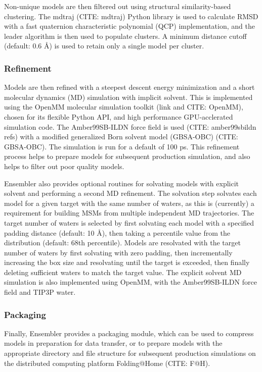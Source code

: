 \documentclass[aps,pre,twocolumn,nofootinbib,superscriptaddress,linenumbers]{revtex4-1}
\begin{document}
Non-unique models are then filtered out using structural similarity-based clustering.
The mdtraj (CITE: mdtraj) Python library is used to calculate RMSD with a fast quaternion characteristic polynomial (QCP) implementation, and the leader algorithm is then used to populate clusters.
A minimum distance cutoff (default: 0.6 \AA) is used to retain only a single model per cluster.

\subsubsection{Refinement}

Models are then refined with a steepest descent energy minimization and a short molecular dynamics (MD) simulation with implicit solvent.
This is implemented using the OpenMM molecular simulation toolkit (link and CITE: OpenMM), chosen for its flexible Python API, and high performance GPU-acclerated simulation code.
The Amber99SB-ILDN force field is used (CITE: amber99sbildn refs) with a modified generalized Born solvent model (GBSA-OBC) (CITE: GBSA-OBC).
The simulation is run for a default of 100 ps.
This refinement process helps to prepare models for subsequent production simulation, and also helps to filter out poor quality models.

Ensembler also provides optional routines for solvating models with explicit solvent and performing a second MD refinement.
The solvation step solvates each model for a given target with the same number of waters, as this is (currently) a requirement for building MSMs from multiple independent MD trajectories.
The target number of waters is selected by first solvating each model with a specified padding distance (default: 10 \AA), then taking a percentile value from the distribution (default: 68th percentile).
Models are resolvated with the target number of waters by first solvating with zero padding, then incrementally increasing the box size and resolvating until the target is exceeded, then finally deleting sufficient waters to match the target value.
The explicit solvent MD simulation is also implemented using OpenMM, with the Amber99SB-ILDN force field and TIP3P water.

\subsubsection{Packaging}

Finally, Ensembler provides a packaging module, which can be used to compress models in preparation for data transfer, or to prepare models with the appropriate directory and file structure for subsequent production simulations on the distributed computing platform Folding@Home (CITE: F@H).
\end{document}

